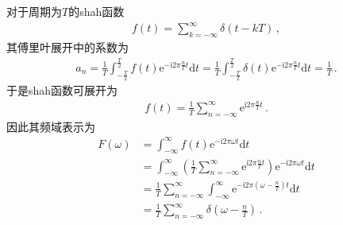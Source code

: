 对于周期为$T$的shah函数
\begin{align}
    f(t)=\sum\limits_{k=-\infty}^{\infty}\delta(t-kT)\, ,
\end{align}
其傅里叶展开中的系数为
\begin{align}
    a_n=\frac{1}{T}\int_{-\frac{T}{2}}^{\frac{T}{2}}f(t)\mathrm{e}^{-\mathrm{i}2\pi\frac{n}{T}t}\mathrm{d}t
    =\frac{1}{T}\int_{-\frac{T}{2}}^{\frac{T}{2}}\delta(t)\mathrm{e}^{-\mathrm{i}2\pi\frac{n}{T}t}\mathrm{d}t
    =\frac{1}{T}\, .
\end{align}
于是shah函数可展开为
\begin{align}
    f(t)=\frac{1}{T}\sum\limits_{n=-\infty}^{\infty}\mathrm{e}^{\mathrm{i}2\pi\frac{n}{T}t}\, .
\end{align}
因此其频域表示为
\begin{align}
    F(\omega) & =\int_{-\infty}^{\infty}f(t)\mathrm{e}^{-\mathrm{i}2\pi\omega t}\mathrm{d}t\nonumber                                                                                            \\
              & =\int_{-\infty}^{\infty}\left(\frac{1}{T}\sum\limits_{n=-\infty}^{\infty}\mathrm{e}^{\mathrm{i}2\pi\frac{n}{T}t}\right)\mathrm{e}^{-\mathrm{i}2\pi\omega t}\mathrm{d}t\nonumber \\
              & =\frac{1}{T}\sum\limits_{n=-\infty}^{\infty}\int_{-\infty}^{\infty}\mathrm{e}^{-\mathrm{i}2\pi(\omega-\frac{n}{T})t}\mathrm{d}t\nonumber                                        \\
              & =\frac{1}{T}\sum\limits_{n=-\infty}^{\infty}\delta\left(\omega-\frac{n}{T}\right)\, .
\end{align}